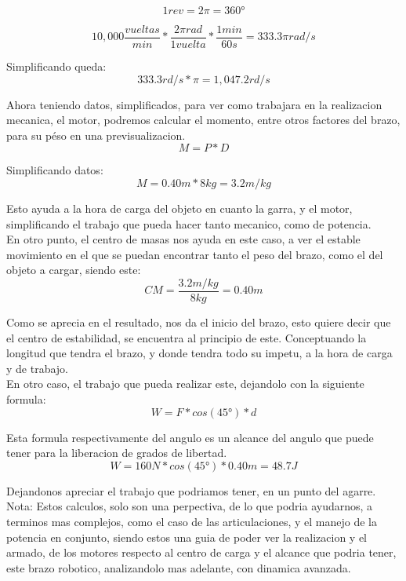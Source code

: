 \documentclass[14pt,a4paper]{article}
\begin{document}
$$ 1rev=2\pi=360°$$

$$ 10,000 \frac{vueltas}{min}*\dfrac{2\pi rad}{1 vuelta}*\frac{1 min}{60s}= 333.3 \pi rad/s $$

Simplificando \pi queda:\\

$$ 333.3 rd/s* \pi= 1,047.2 rd/s $$

Ahora teniendo datos, simplificados, para ver como trabajara en la realizacion mecanica, el motor, podremos calcular el momento, entre otros factores del brazo, para su péso en una previsualizacion.\\

$$ M= P*D $$

Simplificando datos:\\

$$ M=0.40m*8kg= 3.2 m/kg $$

Esto ayuda a la hora de carga del objeto en cuanto la garra, y el motor, simplificando el trabajo que pueda hacer tanto mecanico, como de potencia.\\
En otro punto, el centro de masas nos ayuda en este caso, a ver el estable movimiento en el que se puedan encontrar tanto el peso del brazo, como el del objeto a cargar, siendo este:\\

$$ CM=\frac{3.2 m/kg}{8kg}= 0.40m $$

Como se aprecia en el resultado, nos da el inicio del brazo, esto quiere decir que el centro de estabilidad, se encuentra al principio de este. Conceptuando la longitud que tendra el brazo, y donde tendra todo su impetu, a la hora de carga y de trabajo.\\
En otro caso, el trabajo que pueda realizar este, dejandolo con la siguiente formula:\\

$$ W= F*cos(45°)*d $$

Esta formula respectivamente del angulo es un alcance del angulo que puede tener para la liberacion de grados de libertad.\\

$$ W= 160N*cos(45°)*0.40m= 48.7 J $$

Dejandonos apreciar el trabajo que podriamos tener, en un punto del agarre.\\

Nota: Estos calculos, solo son una perpectiva, de lo que podria ayudarnos, a terminos mas complejos, como el caso de las articulaciones, y el manejo de la potencia en conjunto, siendo estos una guia de poder ver la realizacion y el armado, de los motores respecto al centro de carga y el alcance que podria tener, este brazo robotico, analizandolo mas adelante, con dinamica avanzada.\\
\end{document}
